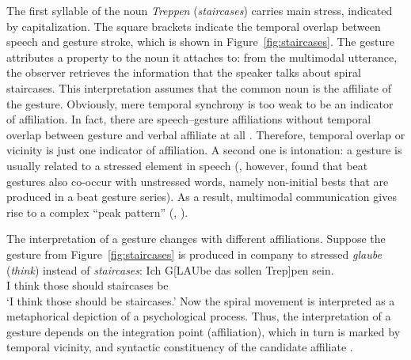 \documentclass[output=paper
 	        ,biblatex
                ,babelshorthands
                ,newtxmath
                ,draftmode
                ,colorlinks, citecolor=brown
]{langscibook}
\begin{document}
\noindent The first syllable of the  noun \textit{Treppen} (\textit{staircases}) carries main stress, indicated by capitalization. 
%
The square brackets indicate the temporal overlap between speech and gesture stroke, which is shown in Figure~\ref{fig:staircases}.
%
The gesture attributes a property to the noun it attaches to: from the multimodal utterance, the observer retrieves the information that the speaker talks about spiral staircases. 
%
This interpretation assumes that the common noun is the affiliate of the gesture.
%
Obviously, mere temporal synchrony is too weak to be an indicator of affiliation.
%
In fact, there are speech--gesture affiliations without temporal overlap between gesture and verbal affiliate at all \citep[e.g.][]{Luecking:Rieser:Stegmann:2004}.
%
Therefore, temporal overlap or vicinity is just one indicator of affiliation. A second one is intonation: a gesture is usually related to a stressed element in speech \citep[]{Loehr:2007} (\citealp{McClave:1994}, however, found that beat gestures also co-occur with unstressed words, namely non-initial bests that are produced in a beat gesture series).
%
As a result, multimodal communication gives rise to a complex \enquote{peak pattern} (\citealp[]{Tuite:1993}, \citealp[]{Loehr:2004}).


The interpretation of a gesture changes with different affiliations.
%
Suppose the gesture from Figure~\ref{fig:staircases} is produced in company to stressed \textit{glaube} (\textit{think}) instead of \textit{staircases}: 
%
\ea \label{ex:think}
\gll Ich G[LAUbe das sollen Trep]pen sein.\\
     I think those should staircases be \\
\glt \enquote*{I think those should be staircases.}
\z
%
Now the spiral movement is interpreted as a metaphorical depiction of a psychological process.
%
Thus, the interpretation of a gesture depends on the integration point (affiliation), which in turn is marked by temporal vicinity,  and syntactic constituency of the candidate affiliate \citep{Alahverdzhieva:Lascarides:Flickinger:2017}.
\end{document}
